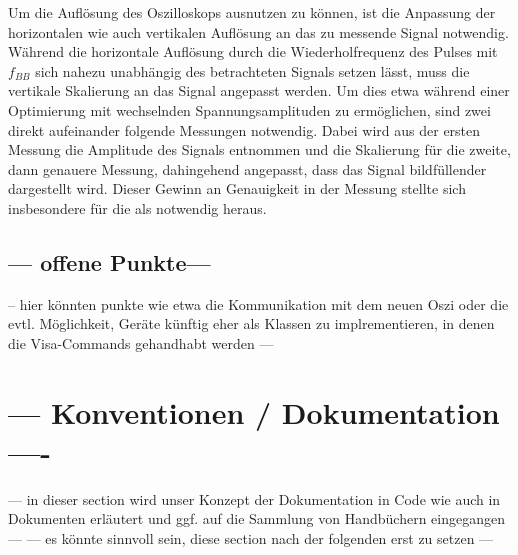 \documentclass[../Report.tex]{subfiles}
\begin{document}
Um die Auflösung des Oszilloskops ausnutzen zu können, ist die Anpassung der horizontalen wie auch vertikalen Auflösung an das zu messende Signal notwendig.
Während die horizontale Auflösung durch die Wiederholfrequenz des Pulses mit $f_{BB}$ sich nahezu unabhängig des betrachteten Signals setzen lässt, muss die vertikale Skalierung an das Signal angepasst werden. Um dies etwa während einer Optimierung mit wechselnden Spannungsamplituden zu ermöglichen, sind zwei direkt aufeinander folgende Messungen notwendig. Dabei wird aus der ersten Messung die Amplitude des Signals entnommen und die Skalierung für die zweite, dann genauere Messung, dahingehend angepasst, dass das Signal bildfüllender dargestellt wird.
Dieser Gewinn an Genauigkeit in der Messung stellte sich insbesondere für die  als notwendig heraus.


\subsection{--- offene Punkte---}
\label{subsec:vorg.geraete.open}
-- hier könnten punkte wie etwa die Kommunikation mit dem neuen Oszi oder die evtl. Möglichkeit, Geräte künftig eher als Klassen zu implrementieren, in denen die Visa-Commands gehandhabt werden --- 


\section{ --- Konventionen / Dokumentation ---- }
\label{sec:vorg.doku}
--- in dieser section wird unser Konzept der Dokumentation in Code wie auch in Dokumenten erläutert und ggf. auf die Sammlung von Handbüchern eingegangen --- 
--- es könnte sinnvoll sein, diese section nach der folgenden erst zu setzen --- 
\end{document}
